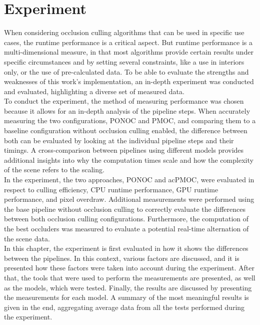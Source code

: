 \chapter{Experiment} \label{cpt-experiment}

When considering occlusion culling algorithms that can be used in specific use cases, the runtime 
performance is a critical aspect. But runtime performance is a multi-dimensional measure, in that 
most algorithms provide certain results under specific circumstances and by setting several constraints, 
like a use in interiors only, or the use of pre-calculated data. To be able to evaluate the strengths 
and weaknesses of this work's implementation, an in-depth experiment was conducted and evaluated, 
highlighting a diverse set of measured data. \\

\noindent
To conduct the experiment, the method of measuring performance was chosen because it allows for 
an in-depth analysis of the pipeline steps. When accurately measuring the two configurations, 
\ac{PONOC} and \ac{PMOC}, and comparing them to a baseline configuration without occlusion culling 
enabled, the difference between both can be evaluated by looking at the individual pipeline steps 
and their timings. A cross-comparison between pipelines using different models provides additional 
insights into why the computation times scale and how the complexity of the scene refers to the scaling. \\

\noindent
In the experiment, the two approaches, \ac{PONOC} and ac{PMOC}, were evaluated in respect to 
culling efficiency, \ac{CPU} runtime performance, GPU runtime performance, and pixel overdraw.
Additional measurements were performed using the base pipeline without occlusion culling to 
correctly evaluate the differences between both occlusion culling configurations. Furthermore, 
the computation of the best occluders was measured to evaluate a potential real-time alternation 
of the scene data. \\

\noindent
In this chapter, the experiment is first evaluated in how it shows the differences between the pipelines. 
In this context, various factors are discussed, and it is presented how these factors were taken into account 
during the experiment. After that, the tools that were used to perform the measurements are presented, as 
well as the models, which were tested. Finally, the results are discussed by presenting the measurements 
for each model. A summary of the most meaningful results is given in the end, aggregating average data from 
all the tests performed during the experiment.

